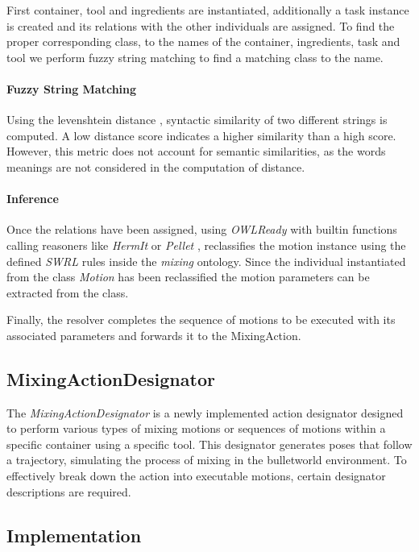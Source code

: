 First container, tool and ingredients are instantiated, additionally a task instance is created and its relations with 
the other individuals are assigned. To find the proper corresponding class, to the names of the container, ingredients, task and tool
we perform fuzzy string matching to find a matching class to the name. 

\paragraph{Fuzzy String Matching}
Using the levenshtein distance \cite{levenshtein_distance}, syntactic similarity of two different strings is computed. A low distance score
indicates a higher similarity than a high score. However, this metric does not account for semantic similarities, 
as the words meanings are not considered in the computation of distance.

\paragraph{Inference}
Once the relations have been assigned, using \textit{OWLReady} with builtin functions 
calling reasoners like \textit{HermIt} \cite{shearer2008hermit} or \textit{Pellet} \cite{sirin2007pellet},
reclassifies the motion instance using the defined \textit{SWRL} rules inside the \textit{mixing} ontology.
Since the individual instantiated from the class \textit{Motion} has been reclassified the motion parameters can be extracted from the class.

Finally, the resolver completes the sequence of motions to be executed with its associated parameters and 
forwards it to the MixingAction.

\subsection{MixingActionDesignator}
The \textit{MixingActionDesignator} is a newly implemented action designator 
designed to perform various types of mixing motions or sequences of motions within a specific container using a specific tool. 
This designator generates poses that follow a trajectory, simulating the process of mixing in the bulletworld environment.
To effectively break down the action into executable motions, certain designator descriptions are required.

\subsection{Implementation}

